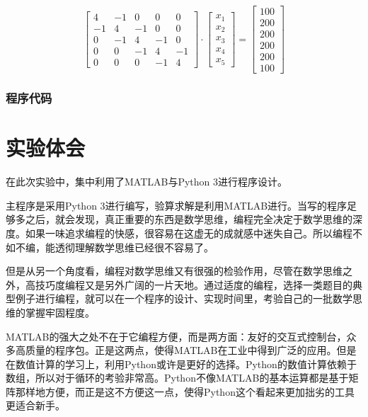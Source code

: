 \documentclass[UTF8, a4paper, zihao=-4, bibliography=totoc]{ctexart}
\begin{document}
\begin{equation}
\left[ \begin{array}{rrrrr}{4} & {-1} & {0} & {0} & {0} \\ {-1} & {4} & {-1} & {0} & {0} \\ {0} & {-1} & {4} & {-1} & {0} \\ {0} & {0} & {-1} & {4} & {-1} \\ {0} & {0} & {0} & {-1} & {4}\end{array}\right] \cdot \left[ \begin{array}{c}{x_{1}} \\ {x_{2}} \\ {x_{3}} \\ {x_{4}} \\ {x_{5}}\end{array}\right]=\left[ \begin{array}{c}{100} \\ {200} \\ {200} \\ {200} \\ {200} \\ {100}\end{array}\right]
\end{equation}

\subsubsection{程序代码}


\section{实验体会}

在此次实验中，集中利用了MATLAB与Python 3进行程序设计。

主程序是采用Python 3进行编写，验算求解是利用MATLAB进行。当写的程序足够多之后，就会发现，真正重要的东西是数学思维，编程完全决定于数学思维的深度。如果一味追求编程的快感，很容易在这虚无的成就感中迷失自己。所以编程不如不编，能透彻理解数学思维已经很不容易了。

但是从另一个角度看，编程对数学思维又有很强的检验作用，尽管在数学思维之外，高技巧度编程又是另外广阔的一片天地。通过适度的编程，选择一类题目的典型例子进行编程，就可以在一个程序的设计、实现时间里，考验自己的一批数学思维的掌握牢固程度。

MATLAB的强大之处不在于它编程方便，而是两方面：友好的交互式控制台，众多高质量的程序包。正是这两点，使得MATLAB在工业中得到广泛的应用。但是在数值计算的学习上，利用Python或许是更好的选择。Python的数值计算依赖于数组，所以对于循环的考验非常高。Python不像MATLAB的基本运算都是基于矩阵那样地方便，而正是这不方便这一点，使得Python这个看起来更加拙劣的工具更适合新手。
\end{document}
